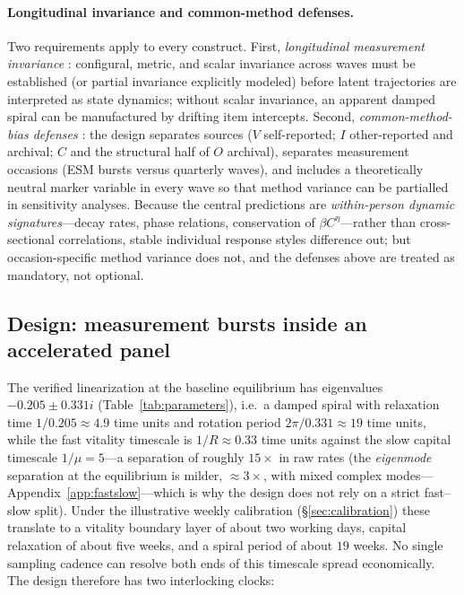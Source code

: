 \paragraph{Longitudinal invariance and common-method defenses.}
Two requirements apply to every construct. First, \emph{longitudinal
measurement invariance} \citep{vandenberg2000invariance}: configural,
metric, and scalar invariance across waves must be established (or partial
invariance explicitly modeled) before latent trajectories are interpreted
as state dynamics; without scalar invariance, an apparent damped spiral can
be manufactured by drifting item intercepts. Second,
\emph{common-method-bias defenses} \citep{podsakoff2003common}: the design
separates sources ($V$ self-reported; $I$ other-reported and archival; $C$
and the structural half of $O$ archival), separates measurement occasions
(ESM bursts versus quarterly waves), and includes a theoretically neutral
marker variable \citep{lindell2001marker} in every wave so that method
variance can be partialled in sensitivity analyses. Because the central predictions are
\emph{within-person dynamic signatures}---decay rates, phase relations,
conservation of $\beta C^{\eta}$---rather than cross-sectional correlations,
stable individual response styles difference out; but occasion-specific
method variance does not, and the defenses above are treated as mandatory,
not optional.

\subsection{Design: measurement bursts inside an accelerated panel}
\label{sec:emp-design}

The verified linearization at the baseline equilibrium has eigenvalues
$-0.205\pm0.331i$ (Table~\ref{tab:parameters}), i.e.\ a damped spiral with
relaxation time $1/0.205\approx4.9$ time units and rotation period
$2\pi/0.331\approx19$ time units, while the fast vitality timescale is
$1/R\approx0.33$ time units against the slow capital timescale
$1/\mu=5$---a separation of roughly $15\times$ in raw rates (the
\emph{eigenmode} separation at the equilibrium is milder, $\approx3\times$,
with mixed complex modes---Appendix~\ref{app:fastslow}---which is why the
design does not rely on a strict fast--slow split). Under the illustrative
weekly calibration (\S\ref{sec:calibration}) these translate to a vitality
boundary layer of about two working days, capital relaxation of about five
weeks, and a spiral period of about $19$ weeks. No single sampling cadence
can resolve both ends of this timescale spread economically. The
design therefore has two interlocking clocks:

